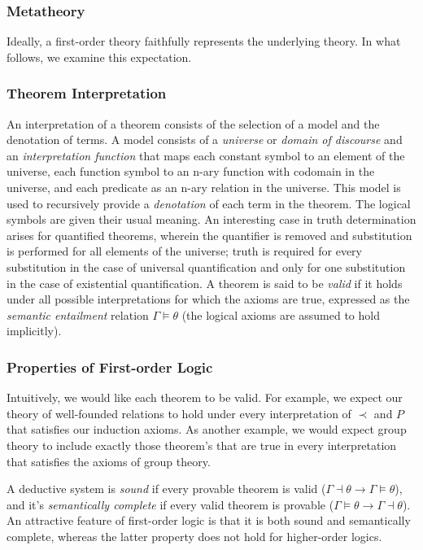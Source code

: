 \documentclass{article}
\begin{document}
\subsubsection{Metatheory}
Ideally, a first-order theory faithfully represents the underlying theory. In what follows, we examine this expectation.

\subsubsection{Theorem Interpretation}
An interpretation of a theorem consists of the selection of a model and the denotation of terms. A model consists of a \textit{universe} or \textit{domain of discourse} and an \textit{interpretation function} that maps each constant symbol to an element of the universe, each function symbol to an n-ary function with codomain in the universe, and each predicate as an n-ary relation in the universe. This model is used to recursively provide a \textit{denotation} of each term in the theorem. The logical symbols are given their usual meaning. An interesting case in truth determination arises for quantified theorems, wherein the quantifier is removed and substitution is performed for all elements of the universe; truth is required for every substitution in the case of universal quantification and only for one substitution in the case of existential quantification. A theorem is said to be \textit{valid} if it holds under all possible interpretations for which the axioms are true, expressed as the \textit{semantic entailment} relation $\Gamma \vDash \theta$ (the logical axioms are assumed to hold implicitly).

\subsubsection{Properties of First-order Logic}
Intuitively, we would like each theorem to be valid. For example, we expect our theory of well-founded relations to hold under every interpretation of $\prec$ and $P$ that satisfies our induction axioms. As another example, we would expect group theory to include exactly those theorem's that are true in every interpretation that satisfies the axioms of group theory. 

A deductive system is \textit{sound} if every provable theorem is valid ($\Gamma \dashv \theta \to \Gamma \vDash \theta$), and it's \textit{semantically complete} if every valid theorem is provable ($\Gamma \vDash \theta \to \Gamma \dashv \theta$). An attractive feature of first-order logic is that it is both sound and semantically complete, whereas the latter property does not hold for higher-order logics. 
\end{document}
